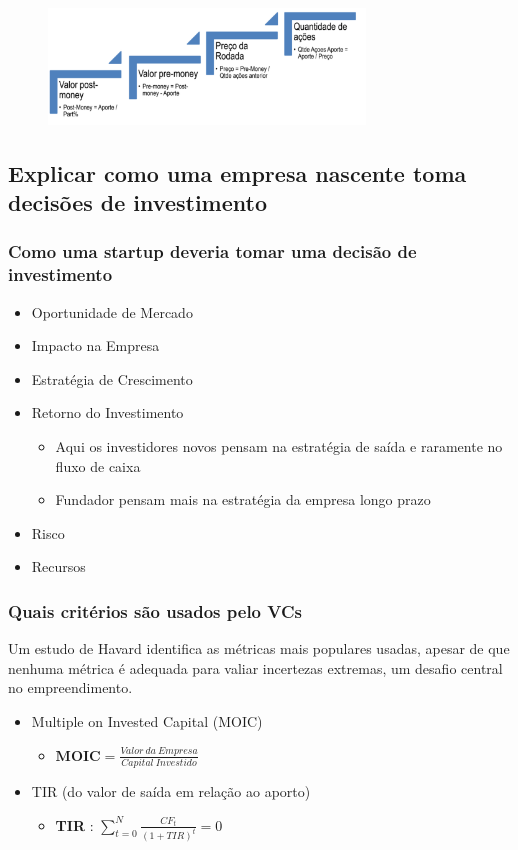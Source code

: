 \documentclass{sciposter}
\begin{document}
\begin{multicols}{3}
\begin{figure}[H]
    \centering
    \includegraphics[width=0.75\textwidth]{preposmoney.png}
\end{figure}

\subsection{\textbf{Explicar como uma empresa nascente toma decisões de investimento}}
\subsubsection*{\textbf{Como uma startup deveria tomar uma decisão de investimento}}
\begin{itemize}
    \item Oportunidade de Mercado 
    \item Impacto na Empresa 
    \item Estratégia de Crescimento
    \item Retorno do Investimento \begin{itemize}
        \item Aqui os investidores novos pensam na estratégia de saída e raramente no fluxo de caixa
        \item Fundador pensam mais na estratégia da empresa longo prazo
    \end{itemize}
    \item Risco
    \item Recursos
\end{itemize}

\subsubsection*{\textbf{Quais critérios são usados pelo VCs}}
Um estudo de Havard identifica as métricas mais populares usadas, apesar de que nenhuma métrica é adequada para valiar incertezas extremas, um desafio central no empreendimento.

\begin{itemize}
    \item Multiple on Invested Capital (MOIC) \begin{itemize}
        \item $\textbf{MOIC} = \frac{Valor \ da \ Empresa }{Capital \ Investido}$
    \end{itemize}
    \item TIR (do valor de saída em relação ao aporto) \begin{itemize}
        \item \textbf{TIR} : $\sum_{t=0}^{N}\frac{CF_t}{(1+TIR)^t}=0$
    \end{itemize}
\end{itemize}



\end{multicols}
\end{document}
